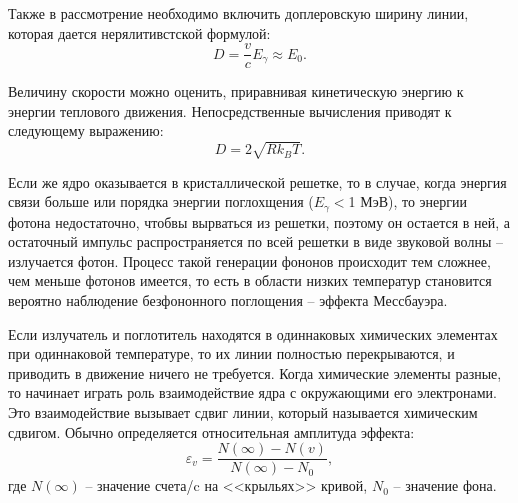 \documentclass[a4paper,12pt]{article} %
\begin{document}
	Также в рассмотрение необходимо включить доплеровскую ширину линии, которая дается нерялитивстской формулой:
	\begin{equation}
		D = \frac{v}{c}E_\gamma \approx E_0.
	\end{equation}
	
	Величину скорости можно оценить, приравнивая кинетическую энергию к энергии теплового движения. Непосредственные вычисления приводят к следующему выражению:
	\begin{equation}
		D = 2 \sqrt{Rk_BT}.
	\end{equation}
	
	Если же ядро оказывается в кристаллической решетке, то в случае, когда энергия связи больше или порядка энергии поглохщения ($E_\gamma <$1 МэВ), то энергии фотона недостаточно, чтобвы вырваться из решетки, поэтому он остается в ней, а остаточный импульс распространяется по всей решетки в виде звуковой волны  -- излучается фотон. Процесс такой генерации фононов происходит тем сложнее, чем меньше фотонов имеется, то есть в области низких температур становится вероятно наблюдение безфононного поглощения -- эффекта Мессбауэра.
	
	Если излучатель и поглотитель находятся в одиннаковых химических элементах при одиннаковой температуре, то их линии полностью перекрываются, и приводить в движение ничего не требуется. Когда химические элементы разные, то начинает играть роль взаимодействие ядра с окружающими его электронами. Это взаимодействие вызывает сдвиг линии, который называется химическим сдвигом. Обычно определяется относительная амплитуда эффекта:
	\begin{equation}
		\varepsilon_v = \frac{N(\infty) - N(v)}{N(\infty) - N_0},
	\end{equation}
	где $N(\infty)$ -- значение счета/c на <<крыльях>> кривой, $N_0$ -- значение фона.
	
	
\newpage
\end{document}
